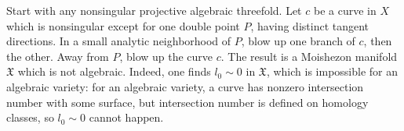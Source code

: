 Start with any nonsingular projective algebraic threefold. Let $c$ be a curve in $X$ which is nonsingular except for one double point $P$, having distinct tangent directions. In a small analytic neighborhood of $P$, blow up one branch of $c$, then the other. Away from $P$, blow up the curve $c$. The result is a Moishezon manifold $\mathfrak{X}$ which is not algebraic. Indeed, one finds $l_0 \sim 0$ in $\mathfrak{X}$, which is impossible for an algebraic variety: for an algebraic variety, a curve has nonzero intersection number with some surface, but intersection number is defined on homology classes, so $l_0 \sim 0$ cannot happen.